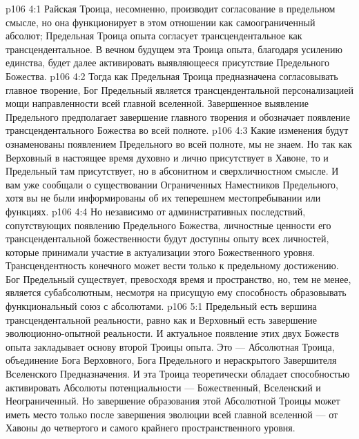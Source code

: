 \vs p106 4:1 Райская Троица, несомненно, производит согласование в предельном смысле, но она функционирует в этом отношении как самоограниченный абсолют; Предельная Троица опыта согласует трансцендентальное как трансцендентальное. В вечном будущем эта Троица опыта, благодаря усилению единства, будет далее активировать выявляющееся присутствие Предельного Божества.
\vs p106 4:2 Тогда как Предельная Троица предназначена согласовывать главное творение, Бог Предельный является трансцендентальной персонализацией мощи направленности всей главной вселенной. Завершенное выявление Предельного предполагает завершение главного творения и обозначает появление трансцендентального Божества во всей полноте.
\vs p106 4:3 Какие изменения будут ознаменованы появлением Предельного во всей полноте, мы не знаем. Но так как Верховный в настоящее время духовно и лично присутствует в Хавоне, то и Предельный там присутствует, но в абсонитном и сверхличностном смысле. И вам уже сообщали о существовании Ограниченных Наместников Предельного, хотя вы не были информированы об их теперешнем местопребывании или функциях.
\vs p106 4:4 Но независимо от административных последствий, сопутствующих появлению Предельного Божества, личностные ценности его трансцендентальной божественности будут доступны опыту всех личностей, которые принимали участие в актуализации этого Божественного уровня. Трансцендентность конечного может вести только к предельному достижению. Бог Предельный существует, превосходя время и пространство, но, тем не менее, является субабсолютным, несмотря на присущую ему способность образовывать функциональный союз с абсолютами.
\vs p106 5:1 Предельный есть вершина трансцендентальной реальности, равно как и Верховный есть завершение эволюционно\hyp{}опытной реальности. И актуальное появление этих двух Божеств опыта закладывает основу второй Троицы опыта. Это --- Абсолютная Троица, объединение Бога Верховного, Бога Предельного и нераскрытого Завершителя Вселенского Предназначения. И эта Троица теоретически обладает способностью активировать Абсолюты потенциальности --- Божественный, Вселенский и Неограниченный. Но завершение образования этой Абсолютной Троицы может иметь место только после завершения эволюции всей главной вселенной --- от Хавоны до четвертого и самого крайнего пространственного уровня.
